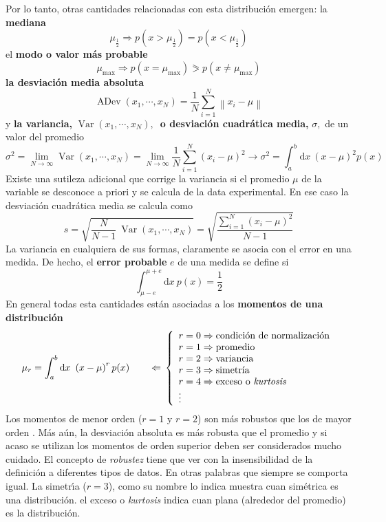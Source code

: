 \documentclass[spanish,titlepage,11pt]{article}
\begin{document}
Por lo tanto, otras cantidades relacionadas con esta distribuci\'{o}n emergen:
la \textbf{mediana}
\[
\mu_{\frac{1}{2}}\Rightarrow p(x>\mu_{\frac{1}{2}})=p(x<\mu_{\frac{1}{2}})
\]
el \textbf{modo o valor m\'{a}s probable}
\[
\mu_{\max}\Rightarrow p(x=\mu_{\max})\eqslantgtr p(x\neq\mu_{\max})
\]
\textbf{la desviaci\'{o}n media absoluta}
\[
\operatorname{ADev}(x_{1},\cdots,x_{N})=\frac{1}{N}\sum_{i=1}^{N}\left\|
x_{i}-\mu\right\|
\]
y \textbf{la variancia, }$\operatorname{Var}(x_{1},\cdots,x_{N}),$\textbf{\ o
desviaci\'{o}n cuadr\'{a}tica media,} $\sigma,$ de un valor del promedio
\[
\sigma^{2}=\lim_{N\rightarrow\infty}\operatorname{Var}(x_{1},\cdots
,x_{N})=\lim_{N\rightarrow\infty}\frac{1}{N}\sum_{i=1}^{N}\left(  x_{i}%
-\mu\right)  ^{2}\rightarrow\sigma^{2}=\int_{a}^{b}\mathrm{d}x\ \left(
x-\mu\right)  ^{2}p(x)
\]
Existe una sutileza adicional que corrige la variancia si el promedio $\mu$ de
la variable se desconoce a priori y se calcula de la data experimental. En ese
caso la desviaci\'{o}n cuadr\'{a}tica media se calcula como
\[
s=\sqrt{\frac{N}{N-1}\ \operatorname{Var}(x_{1},\cdots,x_{N})}=\sqrt
{\frac{\sum_{i=1}^{N}\left(  x_{i}-\mu\right)  ^{2}}{N-1}}
\]
La variancia en cualquiera de sus formas, claramente se asocia con el error en
una medida. De hecho, el \textbf{error probable }$e$ de una medida se define
si
\[
\int_{\mu-e}^{\mu+e}\mathrm{d}x\ p(x)=\frac{1}{2}
\]
En general todas esta cantidades est\'{a}n asociadas a los \textbf{momentos de
una distribuci\'{o}n}
\[
\mu_{r}=\int_{a}^{b}\mathrm{d}x\ \left(  x-\mu\right)  ^{r}p(x)\qquad
\Leftarrow\,\left\{
\begin{array}
[c]{l}%
r=0\Rightarrow\text{condici\'{o}n de normalizaci\'{o}n}\\
r=1\Rightarrow\text{promedio}\\
r=2\Rightarrow\text{variancia}\\
r=3\Rightarrow\text{simetr\'{\i}a}\\
r=4\Rightarrow\text{exceso o \textit{kurtosis}}\\
\vdots
\end{array}
\right.
\]
Los momentos de menor orden ($r=1$ y $r=2$) son m\'{a}s robustos que los de
mayor orden . M\'{a}s a\'{u}n, la desviaci\'{o}n absoluta es m\'{a}s robusta
que el promedio y si acaso se utilizan los momentos de orden superior deben
ser considerados mucho cuidado. El concepto de \textit{robustez} tiene que ver
con la insensibilidad de la definici\'{o}n a diferentes tipos de datos. En
otras palabras que siempre se comporta igual. La simetr\'{\i}a ($r=3$), como
su nombre lo indica muestra cuan sim\'{e}trica es una distribuci\'{o}n. el
exceso o \textit{kurtosis} indica cuan plana (alrededor del promedio) es la
distribuci\'{o}n.
\end{document}
